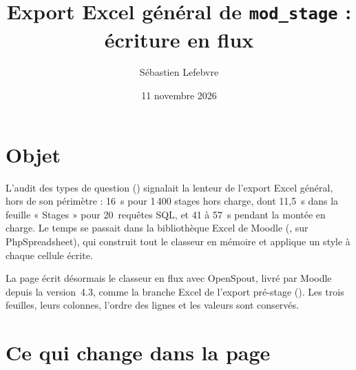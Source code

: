 \documentclass[11pt,a4paper]{article}
\title{Export Excel général de \texttt{mod\_stage} : écriture en flux}
\author{Sébastien Lefebvre}
\date{11 novembre 2026}
\begin{document}
\maketitle

\section{Objet}

L'audit des types de question () signalait la lenteur de l'export
Excel général, hors de son périmètre : 16~s pour 1\,400 stages hors charge, dont 11,5~s dans la
feuille « Stages » pour 20~requêtes SQL, et 41 à 57~s pendant la montée en charge. Le temps se
passait dans la bibliothèque Excel de Moodle (, sur PhpSpreadsheet), qui
construit tout le classeur en mémoire et applique un style à chaque cellule écrite.

La page  écrit désormais le classeur en flux avec OpenSpout, livré par Moodle
depuis la version~4.3, comme la branche Excel de l'export pré-stage
(). Les trois feuilles, leurs colonnes, l'ordre des lignes et les
valeurs sont conservés.

\section{Ce qui change dans la page}
\end{document}
